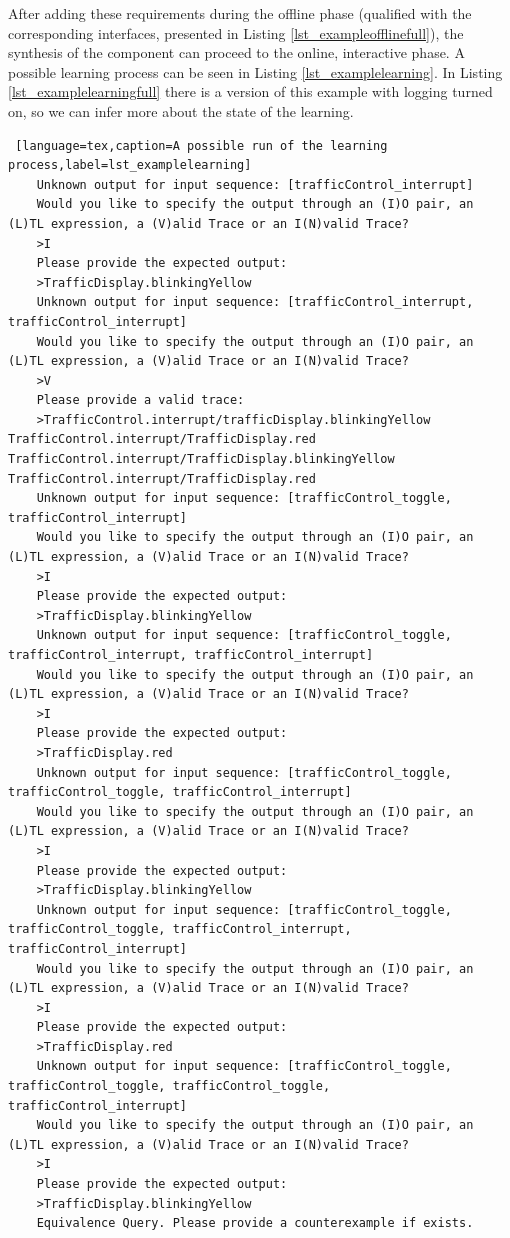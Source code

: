 After adding these requirements during the offline phase (qualified with the corresponding interfaces, presented in Listing \ref{lst_exampleofflinefull}), the synthesis of the component can proceed to the online, interactive phase. A possible learning process can be seen in Listing \ref{lst_examplelearning}. In Listing \ref{lst_examplelearningfull} there is a version of this example with logging turned on, so we can infer more about the state of the learning.

\bigskip
\begin{lstlisting} [language=tex,caption=A possible run of the learning process,label=lst_examplelearning]
	Unknown output for input sequence: [trafficControl_interrupt]
	Would you like to specify the output through an (I)O pair, an (L)TL expression, a (V)alid Trace or an I(N)valid Trace?
	>I
	Please provide the expected output:
	>TrafficDisplay.blinkingYellow
	Unknown output for input sequence: [trafficControl_interrupt, trafficControl_interrupt]
	Would you like to specify the output through an (I)O pair, an (L)TL expression, a (V)alid Trace or an I(N)valid Trace?
	>V
	Please provide a valid trace:
	>TrafficControl.interrupt/trafficDisplay.blinkingYellow TrafficControl.interrupt/TrafficDisplay.red TrafficControl.interrupt/TrafficDisplay.blinkingYellow TrafficControl.interrupt/TrafficDisplay.red
	Unknown output for input sequence: [trafficControl_toggle, trafficControl_interrupt]
	Would you like to specify the output through an (I)O pair, an (L)TL expression, a (V)alid Trace or an I(N)valid Trace?
	>I
	Please provide the expected output:
	>TrafficDisplay.blinkingYellow
	Unknown output for input sequence: [trafficControl_toggle, trafficControl_interrupt, trafficControl_interrupt]
	Would you like to specify the output through an (I)O pair, an (L)TL expression, a (V)alid Trace or an I(N)valid Trace?
	>I
	Please provide the expected output:
	>TrafficDisplay.red
	Unknown output for input sequence: [trafficControl_toggle, trafficControl_toggle, trafficControl_interrupt]
	Would you like to specify the output through an (I)O pair, an (L)TL expression, a (V)alid Trace or an I(N)valid Trace?
	>I
	Please provide the expected output:
	>TrafficDisplay.blinkingYellow
	Unknown output for input sequence: [trafficControl_toggle, trafficControl_toggle, trafficControl_interrupt, trafficControl_interrupt]
	Would you like to specify the output through an (I)O pair, an (L)TL expression, a (V)alid Trace or an I(N)valid Trace?
	>I
	Please provide the expected output:
	>TrafficDisplay.red
	Unknown output for input sequence: [trafficControl_toggle, trafficControl_toggle, trafficControl_toggle, trafficControl_interrupt]
	Would you like to specify the output through an (I)O pair, an (L)TL expression, a (V)alid Trace or an I(N)valid Trace?
	>I
	Please provide the expected output:
	>TrafficDisplay.blinkingYellow
	Equivalence Query. Please provide a counterexample if exists.
\end{lstlisting}

